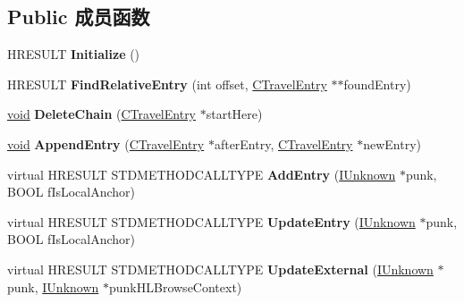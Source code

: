\subsection*{Public 成员函数}
\begin{DoxyCompactItemize}
\item 
\mbox{\label{class_c_travel_log_a54c7d1358c2e13e652015cd5a1eca3bb}} 
H\+R\+E\+S\+U\+LT {\bfseries Initialize} ()
\item 
\mbox{\label{class_c_travel_log_af9da4acd6c7c1354b8331f29b1839091}} 
H\+R\+E\+S\+U\+LT {\bfseries Find\+Relative\+Entry} (int offset, \hyperlink{class_c_travel_entry}{C\+Travel\+Entry} $\ast$$\ast$found\+Entry)
\item 
\mbox{\label{class_c_travel_log_adbb8d1aeab04ff0679fb524e3da9b955}} 
\hyperlink{interfacevoid}{void} {\bfseries Delete\+Chain} (\hyperlink{class_c_travel_entry}{C\+Travel\+Entry} $\ast$start\+Here)
\item 
\mbox{\label{class_c_travel_log_a84a09385ef57d32a26e5dc98ece37f9b}} 
\hyperlink{interfacevoid}{void} {\bfseries Append\+Entry} (\hyperlink{class_c_travel_entry}{C\+Travel\+Entry} $\ast$after\+Entry, \hyperlink{class_c_travel_entry}{C\+Travel\+Entry} $\ast$new\+Entry)
\item 
\mbox{\label{class_c_travel_log_ab577d9b32e28cae1dbd65ed9023aef91}} 
virtual H\+R\+E\+S\+U\+LT S\+T\+D\+M\+E\+T\+H\+O\+D\+C\+A\+L\+L\+T\+Y\+PE {\bfseries Add\+Entry} (\hyperlink{interface_i_unknown}{I\+Unknown} $\ast$punk, B\+O\+OL f\+Is\+Local\+Anchor)
\item 
\mbox{\label{class_c_travel_log_a1a1c44a88fe63347ff45d9da985e7486}} 
virtual H\+R\+E\+S\+U\+LT S\+T\+D\+M\+E\+T\+H\+O\+D\+C\+A\+L\+L\+T\+Y\+PE {\bfseries Update\+Entry} (\hyperlink{interface_i_unknown}{I\+Unknown} $\ast$punk, B\+O\+OL f\+Is\+Local\+Anchor)
\item 
\mbox{\label{class_c_travel_log_afc60e86c62fa6fcf60e956539085340e}} 
virtual H\+R\+E\+S\+U\+LT S\+T\+D\+M\+E\+T\+H\+O\+D\+C\+A\+L\+L\+T\+Y\+PE {\bfseries Update\+External} (\hyperlink{interface_i_unknown}{I\+Unknown} $\ast$punk, \hyperlink{interface_i_unknown}{I\+Unknown} $\ast$punk\+H\+L\+Browse\+Context)
$$
\end{DoxyCompactItemize}
